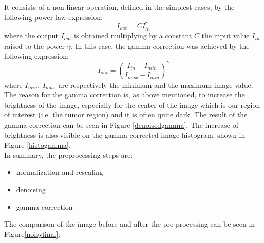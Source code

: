 \documentclass{standalone}
\begin{document}
It consists of a non-linear operation, defined in the simplest cases, by the following power-law expression:
\begin{equation}
    I_{out} = C I_{in}^{\gamma}
\end{equation}
where the output $I_{out}$ is obtained multiplying by a constant $C$ the input value $I_{in}$ raised to the power $\gamma$.
In this case, the gamma correction was achieved by the following expression: 
\begin{equation}
    I_{out} =  (\frac{I_{in} - I_{min}}{I_{max} - I_{min}})^{\gamma}
\end{equation}
where $I_{min}, \: I_{max}$ are respectively the minimum and the maximum image value.
The reason for the gamma correction is, as above mentioned, to increase the brightness of the image, especially for the center of the image which is our region of interest (i.e. the tumor region) and it is often quite dark.
The result of the gamma correction can be seen in Figure \ref{denoisedgamma}.
The increase of brightness is also visible on the gamma-corrected image histogram, shown in Figure \ref{histogamma}.
\\
In summary, the preprocessing steps are:
\begin{itemize}
    \item normalization and rescaling
    \item denoising
    \item gamma correction
\end{itemize}
The comparison of the image before and after the pre-processing can be seen in Figure\ref{noisyfinal}.
\end{document}
